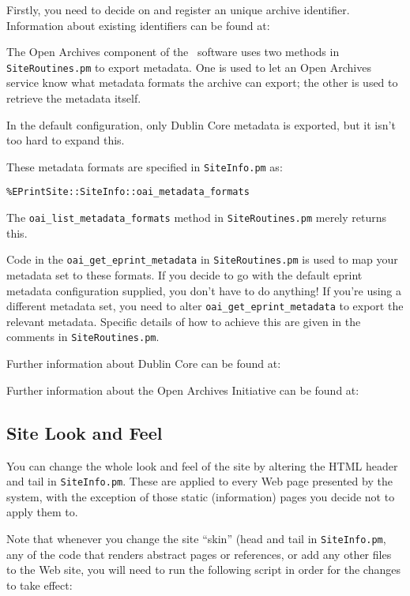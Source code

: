 Firstly, you need to decide on and register an unique archive identifier. Information about existing identifiers can be found at:


The Open Archives component of the \eprints\ software uses two methods in {\tt SiteRoutines.pm} to export metadata. One is used to let an Open Archives service know what metadata formats the archive can export; the other is used to retrieve the metadata itself.

In the default configuration, only Dublin Core metadata is exported, but it isn't too hard to expand this. 

These metadata formats are specified in {\tt SiteInfo.pm} as:

\begin{verbatim}
%EPrintSite::SiteInfo::oai_metadata_formats
\end{verbatim}

The {\tt oai\_list\_metadata\_formats} method in {\tt SiteRoutines.pm} merely returns this.

Code in the {\tt oai\_get\_eprint\_metadata} in {\tt SiteRoutines.pm} is used to map your metadata set to these formats. If you decide to go with the default eprint metadata configuration supplied, you don't have to do anything! If you're using a different metadata set, you need to alter {\tt oai\_get\_eprint\_metadata} to export the relevant metadata. Specific details of how to achieve this are given in the comments in {\tt SiteRoutines.pm}.

Further information about Dublin Core can be found at:


Further information about the Open Archives Initiative can be found at:



\subsection{Site Look and Feel}
\label{install_laf}

You can change the whole look and feel of the site by altering the HTML header and tail in {\tt SiteInfo.pm}. These are applied to every Web page presented by the system, with the exception of those static (information) pages you decide not to apply them to.

Note that whenever you change the site ``skin'' (head and tail in {\tt SiteInfo.pm}, any of the code that renders abstract pages or references, or add any other files to the Web site, you will need to run the following script in order for the changes to take effect:

